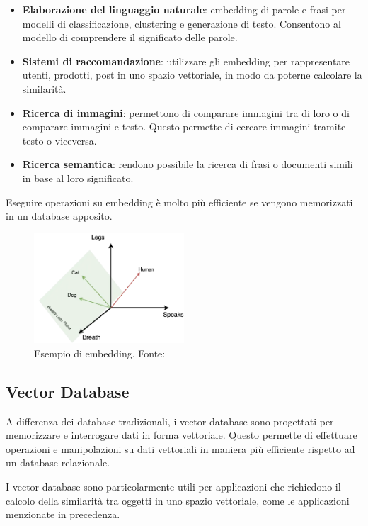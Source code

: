 \begin{itemize}
  \item \textbf{Elaborazione del linguaggio naturale}: embedding
        di parole e frasi per modelli di classificazione,
        clustering e generazione di testo.
        Consentono al modello di comprendere il significato delle
        parole.
  \item \textbf{Sistemi di raccomandazione}: utilizzare gli
        embedding per rappresentare utenti, prodotti, post in uno
        spazio vettoriale, in modo da poterne calcolare la similarità.
  \item \textbf{Ricerca di immagini}: permettono di comparare
        immagini tra di loro o di comparare immagini e testo.
        Questo permette di cercare immagini tramite testo o
        viceversa.
  \item \textbf{Ricerca semantica}: rendono possibile la ricerca di
        frasi o documenti simili in base al loro significato.
\end{itemize}

Eseguire operazioni su embedding è molto più efficiente se
vengono memorizzati in un database apposito.

\begin{figure}[H]
  \centering
  \includegraphics[width=0.5\textwidth]{res/embedding_space.png}
  \caption{Esempio di embedding. Fonte: \cite{olegborisovembeddingspace}}
  \label{fig:embedding-example}
\end{figure}

\subsection{Vector Database}
\label{sec:vector-database}
A differenza dei database tradizionali, i vector database
sono progettati per memorizzare e interrogare dati in forma
vettoriale.
Questo permette di effettuare operazioni e manipolazioni su
dati vettoriali in maniera più efficiente rispetto ad un
database relazionale.

I vector database sono particolarmente utili per
applicazioni che richiedono il calcolo della similarità tra
oggetti in uno spazio vettoriale, come le applicazioni
menzionate in precedenza.

